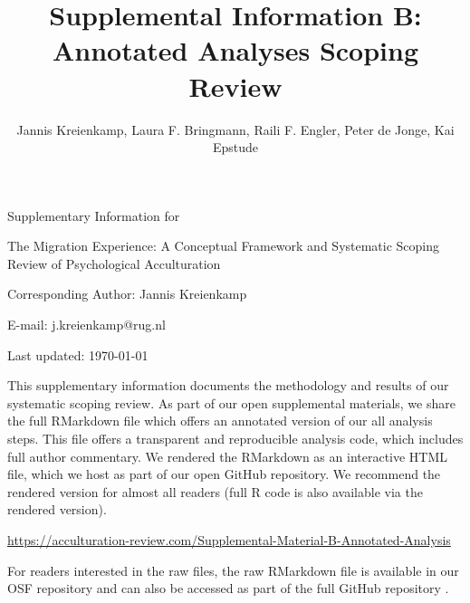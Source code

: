 \documentclass[man, 12pt, a4paper]{apa7}
\title{Supplemental Information B: Annotated Analyses Scoping Review}
\author{Jannis Kreienkamp, Laura F. Bringmann, Raili F. Engler, Peter de Jonge, Kai Epstude}
\begin{document}
\begin{titlepage}
	{\noindent\Large Supplementary Information for \par}
	\vspace{0.5cm}
	{\noindent\Large The Migration Experience: A Conceptual Framework and Systematic Scoping Review of Psychological Acculturation\par}
	\vspace{1.5cm}
	{\noindent\LARGE\bfseries \thetitle \par}
	\vspace{2cm}
	{\noindent\Large\itshape \theauthor \par}
	\vfill
	\noindent Corresponding Author: Jannis Kreienkamp\par
	\noindent E-mail: j.kreienkamp@rug.nl\par
	\vfill

	{\noindent Last updated: \today\par}
\end{titlepage}

\begin{center}
   \textbf{\thetitle} 
\end{center}

This supplementary information documents the methodology and results of our systematic scoping review. As part of our open supplemental materials, we share the full RMarkdown file which offers an annotated version of our all analysis steps. This file offers a transparent and reproducible analysis code, which includes full author commentary. We rendered the RMarkdown as an interactive HTML file, which we host as part of our open GitHub repository. We recommend the rendered version for almost all readers (full R code is also available via the rendered version).

\vspace{.5cm}
\begin{tcolorbox}
    \vspace{0.2cm} \centering 
    \href{https://acculturation-review.com/Supplemental-Material-B-Annotated-Analysis}{https://acculturation-review.com/Supplemental-Material-B-Annotated-Analysis}
    \vspace{0.2cm} 
\end{tcolorbox}

For readers interested in the raw files, the raw RMarkdown file is available in our OSF repository \citep[see][]{Kreienkamp2021a} and can also be accessed as part of the full GitHub repository \citep[][]{Kreienkamp2021b}.

\printbibliography
\end{document}
